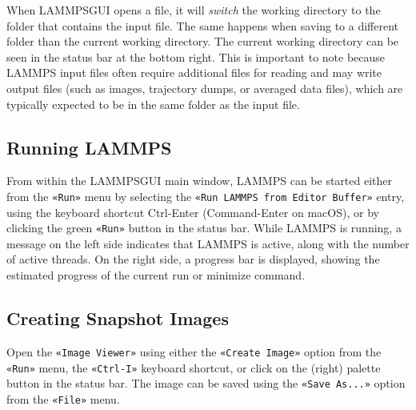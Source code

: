 \documentclass[9pt,tutorial]{livecoms}
\newcommand{\lmpcmd}[1]{\hspace{0pt}\colorbox{listing}{\textcolor{command}{\small{#1}}}\hspace{0pt}} %
\newcommand{\guicmd}[1]{\textcolor{command}{\texttt{«#1»}}} %
\newcommand{\lammpsgui}{\textsf{LAMMPS\textendash GUI}}
\begin{document}
\begin{appendices}
\begin{note}
When \lammpsgui{} opens a file, it will \emph{switch} the working directory
to the folder that contains the input file.  The same happens when saving to
a different folder than the current working directory.  The current working
directory can be seen in the status bar at the bottom right.  This is important
to note because LAMMPS input files often require additional files for reading and may
write output files (such as images, trajectory dumps, or averaged data files),
which are typically expected to be in the same folder as the input file.
\end{note}


\subsection{Running LAMMPS}


From within the \lammpsgui{} main window, LAMMPS can be started either from
the \guicmd{Run} menu by selecting the \guicmd{Run LAMMPS from Editor Buffer} entry,
using the keyboard shortcut Ctrl-Enter (Command-Enter on macOS), or by clicking the
green \guicmd{Run} button in the status bar.  While LAMMPS is running, a message on
the left side indicates that LAMMPS is active, along with the number of active threads.
On the right side, a progress bar is displayed, showing the estimated progress
of the current \lmpcmd{run} or \lmpcmd{minimize} command.

\subsection{Creating Snapshot Images}

Open the \guicmd{Image Viewer} using either the \guicmd{Create Image} option
from the \guicmd{Run} menu, the \guicmd{Ctrl-I} keyboard shortcut,
or click on the (right) palette button in the status bar.  The image
can be saved using the \guicmd{Save As...} option from the \guicmd{File} menu.


\end{appendices}
\end{document}
